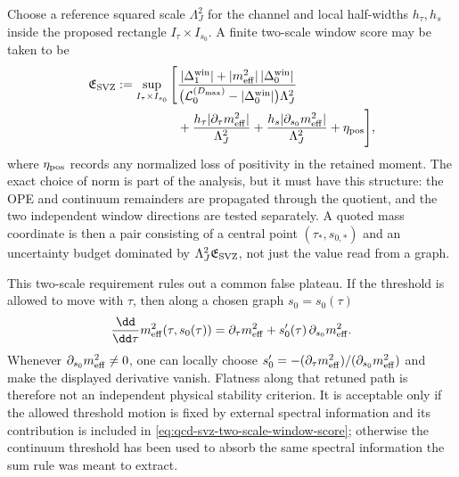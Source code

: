 \begin{controlledapproximation}
Choose a reference squared scale \(\Lambda_J^2\) for the channel and local
half-widths \(h_\tau,h_s\) inside the proposed rectangle
\(I_\tau\times I_{s_0}\).  A finite two-scale window score may be taken to be
\begin{equation}
\begin{aligned}
  \mathfrak E_{\rm SVZ}
  :=
  \sup_{I_\tau\times I_{s_0}}
  \Bigg[
  &\frac{
    |\Delta_1^{\rm win}|
    +
    |m_{\rm eff}^2|\,|\Delta_0^{\rm win}|
  }{
    \bigl(\mathcal L_0^{(D_{\max})}-|\Delta_0^{\rm win}|\bigr)\Lambda_J^2
  }
\\
  &+
  \frac{h_\tau|\partial_\tau m_{\rm eff}^2|}{\Lambda_J^2}
  +
  \frac{h_s|\partial_{s_0}m_{\rm eff}^2|}{\Lambda_J^2}
  +
  \eta_{\rm pos}
  \Bigg],
\end{aligned}
  \label{eq:qcd-svz-two-scale-window-score}
\end{equation}
where \(\eta_{\rm pos}\) records any normalized loss of positivity in the
retained moment.  The exact choice of norm is part of the analysis, but it
must have this structure: the OPE and continuum remainders are propagated
through the quotient, and the two independent window directions are tested
separately.  A quoted mass coordinate is then a pair consisting of a central
point \((\tau_\ast,s_{0,\ast})\) and an uncertainty budget dominated by
\(\Lambda_J^2\mathfrak E_{\rm SVZ}\), not just the value read from a graph.

This two-scale requirement rules out a common false plateau.  If the threshold
is allowed to move with \(\tau\), then along a chosen graph \(s_0=s_0(\tau)\)
\begin{equation}
  \frac{\dd}{\dd\tau}
  m_{\rm eff}^2(\tau,s_0(\tau))
  =
  \partial_\tau m_{\rm eff}^2
  +
  s_0'(\tau)\,\partial_{s_0}m_{\rm eff}^2 .
  \label{eq:qcd-svz-retuned-threshold-total-derivative}
\end{equation}
Whenever \(\partial_{s_0}m_{\rm eff}^2\ne0\), one can locally choose
\(s_0'=-(\partial_\tau m_{\rm eff}^2)/
(\partial_{s_0}m_{\rm eff}^2)\) and make the displayed derivative vanish.
Flatness along that retuned path is therefore not an independent physical
stability criterion.  It is acceptable only if the allowed threshold motion is
fixed by external spectral information and its contribution is included in
\eqref{eq:qcd-svz-two-scale-window-score}; otherwise the continuum threshold
has been used to absorb the same spectral information the sum rule was meant
to extract.
\end{controlledapproximation}

